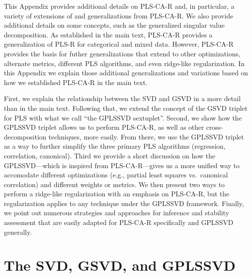 \documentclass[12pt]{article}
\begin{document}
This Appendix provides additional details on PLS-CA-R and, in
particular, a variety of extensions of and generalizations from
PLS-CA-R. We also provide additional details on some concepts, such as
the generalized singular value decomposition. As established in the main
text, PLS-CA-R provides a generalization of PLS-R for categorical and
mixed data. However, PLS-CA-R provides the basis for futher
generalizations that extend to other optimizations, alternate metrics,
different PLS algorithms, and even ridge-like regularization. In this
Appendix we explain those additional generalizations and variations
based on how we established PLS-CA-R in the main text.

First, we explain the relationship between the SVD and GSVD in a more
detail than in the main text. Following that, we extend the concept of
the GSVD triplet for PLS with what we call ``the GPLSSVD sextuplet''.
Second, we show how the GPLSSVD triplet allows us to perform PLS-CA-R,
as well as other cross-decomposition techniques, more easily. From
there, we use the GPLSSVD triplet as a way to further simplify the three
primary PLS algorithms (regression, correlation, canonical). Third we
provide a short discussion on how the GPLSSVD---which is inspired from
PLS-CA-R---gives us a more unified way to accomodate different
optimizations (e.g., partial least squares vs.~canonical correlation)
and different weights or metrics. We then present two ways to perform a
ridge-like regularization with an emphasis on PLS-CA-R, but the
regularization applies to any technique under the GPLSSVD framework.
Finally, we point out numerous strategies and approaches for inference
and stability assessment that are easily adapted for PLS-CA-R
specifically and GPLSSVD generally.

\hypertarget{the-svd-gsvd-and-gplssvd}{%
\section{The SVD, GSVD, and GPLSSVD}\label{the-svd-gsvd-and-gplssvd}}
\end{document}
